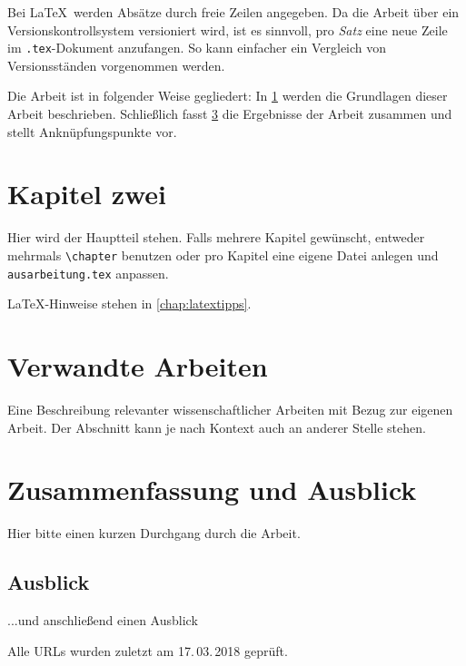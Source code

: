 \documentclass[
  ngerman,
  a4paper,  %
  twoside,  %
  bibliography=totoc,
  headsepline,
  cleardoublepage=empty,
  parskip=half,
  draft=false
]{scrbook}
\begin{document}
Bei \LaTeX\ werden Absätze durch freie Zeilen angegeben.
Da die Arbeit über ein Versionskontrollsystem versioniert wird, ist es sinnvoll, pro \emph{Satz} eine neue Zeile im \texttt{.tex}-Dokument anzufangen.
So kann einfacher ein Vergleich von Versionsständen vorgenommen werden.

Die Arbeit ist in folgender Weise gegliedert:
In \cref{chap:k2} werden die Grundlagen dieser Arbeit beschrieben.
Schließlich fasst \cref{chap:zusfas} die Ergebnisse der Arbeit zusammen und stellt Anknüpfungspunkte vor.


\chapter{Kapitel zwei}
\label{chap:k2}

Hier wird der Hauptteil stehen.
Falls mehrere Kapitel gewünscht, entweder mehrmals \texttt{\textbackslash{}chapter} benutzen oder pro Kapitel eine eigene Datei anlegen und \texttt{ausarbeitung.tex} anpassen.

LaTeX-Hinweise stehen in \cref{chap:latextipps}.

\blinddocument

\chapter{Verwandte Arbeiten}
Eine Beschreibung relevanter wissenschaftlicher Arbeiten mit Bezug zur eigenen Arbeit. Der Abschnitt kann je nach Kontext auch an anderer Stelle stehen.

\chapter{Zusammenfassung und Ausblick}\label{chap:zusfas}
Hier bitte einen kurzen Durchgang durch die Arbeit.

\section*{Ausblick}
...und anschließend einen Ausblick

\printbibliography

Alle URLs wurden zuletzt am 17.\,03.\,2018 geprüft.

\appendix


\pagestyle{empty}
\renewcommand*{\chapterpagestyle}{empty}
\Affirmation
\end{document}
